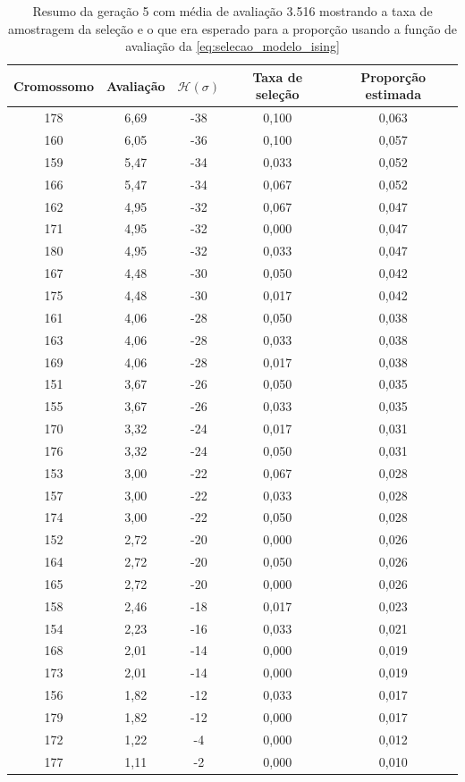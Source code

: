 \begin{table}[h!]
	\begin{tabular}{|c|c|c|c|c|}
		\hline
		\textbf{Cromossomo} 	& \textbf{Avaliação} 	& \textbf{\(\mathcal{H}(\sigma) \)}	& \textbf{Taxa de seleção}	& \textbf{Proporção estimada} \\
		\hline
		178	&  6,69		&  -38 &  0,100	&  0,063\\ \hline
		160	&  6,05		&  -36 &  0,100	&  0,057\\ \hline
		159	&  5,47		&  -34 &  0,033	&  0,052\\ \hline
		166	&  5,47		&  -34 &  0,067	&  0,052\\ \hline
		162	&  4,95		&  -32 &  0,067	&  0,047\\ \hline
		171	&  4,95		&  -32 &  0,000	&  0,047\\ \hline
		180	&  4,95		&  -32 &  0,033	&  0,047\\ \hline
		167	&  4,48		&  -30 &  0,050	&  0,042\\ \hline
		175	&  4,48		&  -30 &  0,017	&  0,042\\ \hline
		161	&  4,06		&  -28 &  0,050	&  0,038\\ \hline
		163	&  4,06		&  -28 &  0,033	&  0,038\\ \hline
		169	&  4,06		&  -28 &  0,017	&  0,038\\ \hline
		151	&  3,67		&  -26 &  0,050	&  0,035\\ \hline
		155	&  3,67		&  -26 &  0,033	&  0,035\\ \hline
		170	&  3,32		&  -24 &  0,017	&  0,031\\ \hline
		176	&  3,32		&  -24 &  0,050	&  0,031\\ \hline
		153	&  3,00		&  -22 &  0,067	&  0,028\\ \hline
		157	&  3,00		&  -22 &  0,033	&  0,028\\ \hline
		174	&  3,00		&  -22 &  0,050	&  0,028\\ \hline
		152	&  2,72		&  -20 &  0,000	&  0,026\\ \hline
		164	&  2,72		&  -20 &  0,050	&  0,026\\ \hline
		165	&  2,72		&  -20 &  0,000	&  0,026\\ \hline
		158	&  2,46		&  -18 &  0,017	&  0,023\\ \hline
		154	&  2,23		&  -16 &  0,033	&  0,021\\ \hline
		168	&  2,01		&  -14 &  0,000	&  0,019\\ \hline
		173	&  2,01		&  -14 &  0,000	&  0,019\\ \hline
		156	&  1,82		&  -12 &  0,033	&  0,017\\ \hline
		179	&  1,82		&  -12 &  0,000	&  0,017\\ \hline
		172	&  1,22		&  -4 &  0,000	&  0,012\\ \hline
		177	&  1,11		&  -2 &  0,000	&  0,010\\
		\hline
	\end{tabular}
	\caption{Resumo da geração 5 com média de avaliação 3.516 mostrando a taxa de amostragem da seleção e o que era esperado para a proporção usando a função de avaliação da \autoref{eq:selecao_modelo_ising}}
	\label{tab:resumo_GA_expH}
\end{table}

